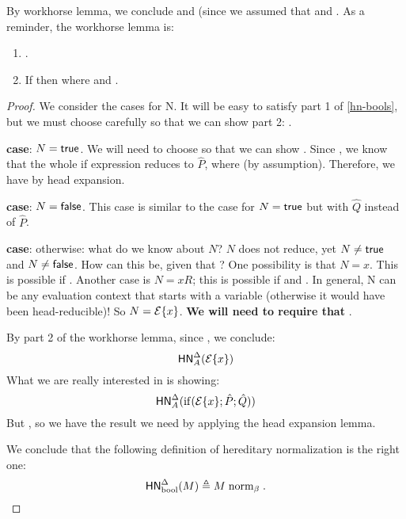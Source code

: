 \documentclass{article}
\begin{document}
By workhorse lemma, we conclude  and  (since we assumed that  and . As a reminder, the workhorse lemma is:

\begin{lemma*}
\leavevmode %
\begin{enumerate}
\item {}   .
\item If \bnorm{\E} then  where  and .
\end{enumerate}
\end{lemma*}

\begin{proof}
We consider the cases for N. It will be easy to satisfy part 1 of \cref{hn-bools}, but we must choose carefully so that we can show part 2: .

\textbf{case}: $N = \mathsf{true}$. We will need to choose 
so that we can show .
Since , we know that the whole if expression
reduces to $\hat{P}$, where  (by assumption). Therefore, we have  by head expansion.

\textbf{case}: $N = \mathsf{false}$. This case is similar to the case for $N = \mathsf{true}$ but with $\hat Q$ instead of $\hat P$.

\textbf{case}: otherwise: what do we know about $N$? $N$ does not reduce, yet $N \neq \mathsf{true}$ and $N \neq \mathsf{false}$. How can this be, given that ? One possibility is that $N = x$. This is possible if . Another case is $N = x R$; this is possible if  and . In general, N can be any evaluation context that starts with a variable (otherwise it would have been head-reducible)! So $N = \mathcal{E} \{ x \}$. \textbf{We will need to require that \bnorm{\E}}.

By part 2 of the workhorse lemma, since \bnorm{\E}, we conclude:
\[
 \mathsf{HN}^{\Delta}_{A}(\mathcal{E} \{ x \})\\
\]
What we are really interested in is showing:
\[
 \mathsf{HN}^{\Delta}_{A}(\mathrm{if}(\mathcal{E} \{ x \}; \hat P; \hat Q)) \\
\]
But , so we have the result we need by applying the head expansion lemma.

We conclude that the following definition of hereditary normalization is the right one:
\[
  \mathsf{HN}^{\Delta}_{\text{bool}}(M) \triangleq M \mathrel{\text{norm}_\beta}.\qedhere
\]
\end{proof}
\end{document}
